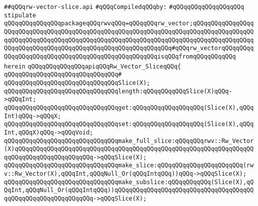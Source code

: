 \label{src/lib/std/src/rw-vector-slice.api}
\verb|##qQQqrw-vector-slice.api|\newline
\newline
\verb|#qQQqCompiledqQQqby:|\newline
\verb|#qQQqqQQqqQQqqQQqqQQq|\newline
\newline
\newline
\verb|stipulate|\newline
\verb|qQQqqQQqqQQqqQQqpackageqQQqrwvqQQq=qQQqqQQqrw_vector;qQQqqQQqqQQqqQQqqQQqqQQqqQQqqQQqqQQqqQQqqQQqqQQqqQQqqQQqqQQqqQQqqQQqqQQqqQQqqQQqqQQqqQQqqQQqqQQqqQQqqQQqqQQqqQQqqQQqqQQqqQQqqQQqqQQqqQQqqQQqqQQqqQQqqQQqqQQqqQQqqQQqqQQqqQQqqQQqqQQqqQQqqQQqqQQqqQQqqQQqqQQq#qQQqrw_vectorqQQqqQQqqQQqqQQqqQQqqQQqqQQqqQQqqQQqqQQqqQQqqQQqqQQqisqQQqfromqQQqqQQqqQQq|\newline
\verb|herein|\newline
\newline
\verb|qQQqqQQqqQQqqQQqapiqQQqRw_Vector_SliceqQQq{|\newline
\verb|qQQqqQQqqQQqqQQqqQQqqQQqqQQqqQQq#|\newline
\verb|qQQqqQQqqQQqqQQqqQQqqQQqqQQqqQQqSlice(X);|\newline
\newline
\verb|qQQqqQQqqQQqqQQqqQQqqQQqqQQqqQQqlength:qQQqqQQqqQQqSlice(X)qQQq->qQQqInt;|\newline
\verb|qQQqqQQqqQQqqQQqqQQqqQQqqQQqqQQqget:qQQqqQQqqQQqqQQqqQQq(Slice(X),qQQqInt)qQQq->qQQqX;|\newline
\verb|qQQqqQQqqQQqqQQqqQQqqQQqqQQqqQQqset:qQQqqQQqqQQqqQQqqQQq(Slice(X),qQQqInt,qQQqX)qQQq->qQQqVoid;|\newline
\newline
\verb|qQQqqQQqqQQqqQQqqQQqqQQqqQQqqQQqmake_full_slice:qQQqqQQqrwv::Rw_Vector(X)qQQqqQQqqQQqqQQqqQQqqQQqqQQqqQQqqQQqqQQqqQQqqQQqqQQqqQQqqQQqqQQqqQQqqQQqqQQqqQQqqQQqqQQqqQQq->qQQqSlice(X);|\newline
\verb|qQQqqQQqqQQqqQQqqQQqqQQqqQQqqQQqmake_slice:qQQqqQQqqQQqqQQqqQQqqQQq(rwv::Rw_Vector(X),qQQqInt,qQQqNull_Or(qQQqIntqQQq))qQQq->qQQqSlice(X);|\newline
\verb|qQQqqQQqqQQqqQQqqQQqqQQqqQQqqQQqmake_subslice:qQQqqQQqqQQq(Slice(X),qQQqInt,qQQqNull_Or(qQQqIntqQQq))qQQqqQQqqQQqqQQqqQQqqQQqqQQqqQQqqQQqqQQqqQQqqQQqqQQqqQQqqQQqqQQq->qQQqSlice(X);|\newline
